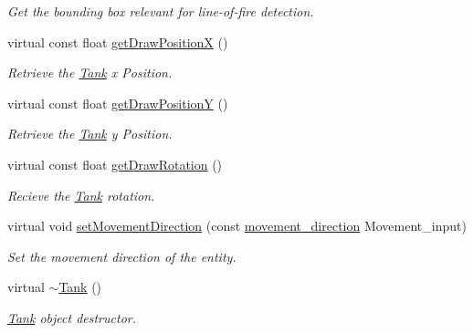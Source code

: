 \begin{DoxyCompactItemize}
\begin{DoxyCompactList}\small\item\em Get the bounding box relevant for line-\/of-\/fire detection. \end{DoxyCompactList}\item 
virtual const float \hyperlink{class_tank_a679ab65e5d46ee6e7fa5fe517101131f}{get\+Draw\+Position\+X} ()
\begin{DoxyCompactList}\small\item\em Retrieve the \hyperlink{class_tank}{Tank} x Position. \end{DoxyCompactList}\item 
virtual const float \hyperlink{class_tank_a5778b15fc49b6cd1086f3a80383b2a37}{get\+Draw\+Position\+Y} ()
\begin{DoxyCompactList}\small\item\em Retrieve the \hyperlink{class_tank}{Tank} y Position. \end{DoxyCompactList}\item 
\hypertarget{class_tank_aa117515fda912f25f9f7d5a8ce4055d7}{virtual const float \hyperlink{class_tank_aa117515fda912f25f9f7d5a8ce4055d7}{get\+Draw\+Rotation} ()}\label{class_tank_aa117515fda912f25f9f7d5a8ce4055d7}

\begin{DoxyCompactList}\small\item\em Recieve the \hyperlink{class_tank}{Tank} rotation. \end{DoxyCompactList}\item 
\hypertarget{class_tank_ae283f9665d114b742cb521acbf0897fe}{virtual void \hyperlink{class_tank_ae283f9665d114b742cb521acbf0897fe}{set\+Movement\+Direction} (const \hyperlink{_structures_8h_a0d0b88f27f3adf9452879b5d9f829026}{movement\+\_\+direction} Movement\+\_\+input)}\label{class_tank_ae283f9665d114b742cb521acbf0897fe}

\begin{DoxyCompactList}\small\item\em Set the movement direction of the entity. \end{DoxyCompactList}\item 
\hypertarget{class_tank_a9e4fce49ae7fe871894c1a3122c10269}{virtual \hyperlink{class_tank_a9e4fce49ae7fe871894c1a3122c10269}{$\sim$\+Tank} ()}\label{class_tank_a9e4fce49ae7fe871894c1a3122c10269}

\begin{DoxyCompactList}\small\item\em \hyperlink{class_tank}{Tank} object destructor. \end{DoxyCompactList}\end{DoxyCompactItemize}
